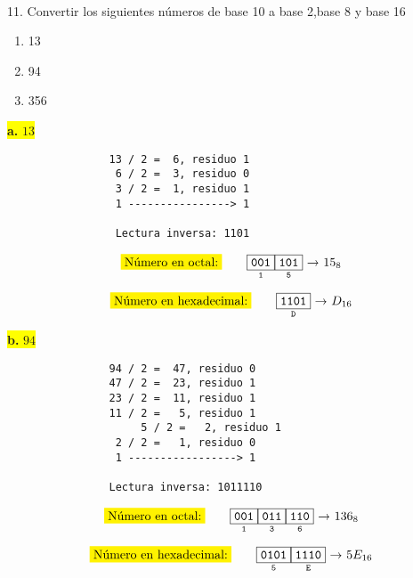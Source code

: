 \documentclass[a4paper,12pt]{article}
\begin{document}
	\hspace{5cm} \\


	11. Convertir los siguientes números de base 10 a base 2,base 8 y base 16
	\begin{enumerate}
		\item  13 
		\item  94 
		\item 356
	\end{enumerate}
\begin{center}	
	\colorbox{yellow}{{\textbf{a.} $13$}} \\ \vspace{0.3cm}
		     \begin{Verbatim}
		     	13 / 2 =  6, residuo 1
		     	 6 / 2 =  3, residuo 0
		     	 3 / 2 =  1, residuo 1
		     	 1 ----------------> 1
		     	
		     	 Lectura inversa: 1101
		     \end{Verbatim}
	     
	     \[
	     \mathtt{
	     	\colorbox{yellow}{Número en octal:} \qquad
	     	\underset{1}{\boxed{\mathtt{001}}}
	     	\underset{5}{\boxed{\mathtt{101}}}
	     	\text{ → $15_8$}
	     }	
	     \] 
	     
	     \[
	     \mathtt{
	     	\colorbox{yellow}{Número en hexadecimal:} \qquad
	     	\underset{D}{\boxed{\mathtt{1101}}}
	      	\text{ → $D_{16}$}
	     }	
	     \]	
\end{center}
\begin{center}	
	\colorbox{yellow}{{\textbf{b.} $94$}} \\ \vspace{0.3cm}
		    \begin{Verbatim}
		    	94 / 2 =  47, residuo 0
		    	47 / 2 =  23, residuo 1
		    	23 / 2 =  11, residuo 1
		    	11 / 2 =   5, residuo 1
		             5 / 2 =   2, residuo 1
		    	 2 / 2 =   1, residuo 0
		    	 1 -----------------> 1
		    	
		    	Lectura inversa: 1011110
		    \end{Verbatim}
	
	\[
	\mathtt{
		\colorbox{yellow}{Número en octal:} \qquad
		\underset{1}{\boxed{\mathtt{001}}}
		\underset{3}{\boxed{\mathtt{011}}}
		\underset{6}{\boxed{\mathtt{110}}}
		\text{ → $136_8$}
	}	
	\] 
	
	\[
	\mathtt{
		\colorbox{yellow}{Número en hexadecimal:} \qquad
		\underset{5}{\boxed{\mathtt{0101}}}
		\underset{E}{\boxed{\mathtt{1110}}}
		\text{ → $5E_{16}$}
	}	
	\]		
\end{center}	
\end{document}
